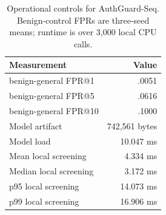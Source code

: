 \begin{table}[t]
  \centering
  \caption{Operational controls for AuthGuard-Seq. Benign-control FPRs are three-seed means;
  runtime is over 3,000 local CPU calls.}
  \label{tab:operational}
  \scriptsize
  \setlength{\tabcolsep}{3.0pt}
  \begin{tabular}{@{}lr@{}}
    \toprule
    Measurement & Value \\
    \midrule
    benign-general FPR@1 & .0051 \\
    benign-general FPR@5 & .0616 \\
    benign-general FPR@10 & .1000 \\
    \midrule
    Model artifact & 742,561 bytes \\
    Model load & 10.047 ms \\
    Mean local screening & 4.334 ms \\
    Median local screening & 3.172 ms \\
    p95 local screening & 14.073 ms \\
    p99 local screening & 16.906 ms \\
    \bottomrule
  \end{tabular}
\end{table}

